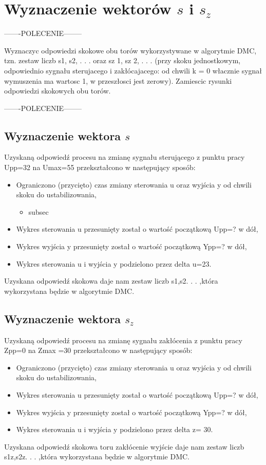 \section{Wyznaczenie wektorów $s$ i $s_z$ }
\label{projekt:zad3}

-------POLECENIE--------

Wyznaczyc odpowiedzi skokowe obu torów wykorzystywane w algorytmie DMC, tzn.
zestaw liczb s1, s2, . . . oraz sz
1, sz
2, . . . (przy skoku jednostkowym, odpowiednio sygnału
sterujacego i zakłócajacego: od chwili k = 0 włacznie sygnał wymuszenia ma wartosc
1, w przeszłosci jest zerowy). Zamiescic rysunki odpowiedzi skokowych obu torów.

-------POLECENIE--------



\subsection{Wyznaczenie wektora $s$}

Uzyskaną odpowiedź procesu na zmianę sygnału sterującego z punktu pracy Upp=32 na
Umax=55 przekształcono w następujący sposób: 
\begin{itemize}
    \item Ograniczono (przycięto) czas zmiany sterowania u oraz wyjścia y od chwili skoku do ustabilizowania, 
    \begin{itemize}
        \item subsec
    \end{itemize}
    \item Wykres sterowania u przesunięty został o wartość początkową Upp=? w dół, 
    \item Wykres wyjścia y przesunięty został o wartość początkową Ypp=? w dół, 
    \item Wykres sterowania u i wyjścia y podzielono przez delta u=23. 
\end{itemize}

Uzyskana odpowiedź skokowa daje nam zestaw liczb s1,s2. . . ,która wykorzystana będzie w algorytmie DMC.

\subsection{Wyznaczenie wektora $s_z$}

Uzyskaną odpowiedź procesu na zmianę sygnału zakłócenia z punktu pracy Zpp=0 na
Zmax =30 przekształcono w następujący sposób: 
\begin{itemize}
\item Ograniczono (przycięto) czas zmiany sterowania u oraz wyjścia y od chwili skoku do ustabilizowania, 
\item Wykres sterowania u przesunięty został o wartość początkową Upp=? w dół, 
\item Wykres wyjścia y przesunięty został o wartość początkową Ypp=? w dół, 
\item Wykres sterowania u i wyjścia y podzielono przez delta z= 30.
\end{itemize}


Uzyskana odpowiedź skokowa toru zakłócenie wyjście daje nam zestaw liczb s1z,s2z. . .
,która wykorzystana będzie w algorytmie DMC.
